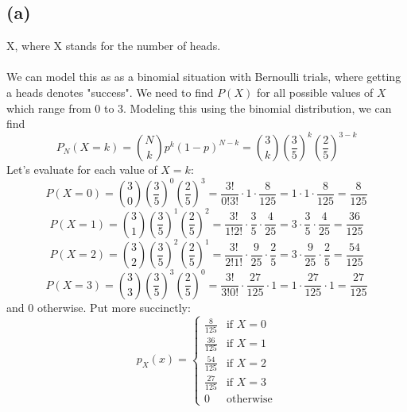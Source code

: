 \documentclass{article}
\begin{document}
{\subsection*{(a)} 
X, where X stands for the number of heads.
\\
\\
We can model this as as a binomial situation with Bernoulli trials, where getting a heads denotes "success". We need to find \(P(X)\) for all possible values of \(X\) which range from 0 to 3. Modeling this using the binomial distribution, we can find 
\[
P_N(X=k) = \binom{N}{k}p^k{(1-p)}^{N-k} = \binom{3}{k}{(\frac{3}{5})}^k{(\frac{2}{5})}^{3-k} 
\]
Let's evaluate for each value of \(X=k\):
\[
P(X=0) = \binom{3}{0}{(\frac{3}{5})}^0{(\frac{2}{5})}^3 = \frac{3!}{0!3!} \cdot 1 \cdot \frac{8}{125} = 1 \cdot 1 \cdot \frac{8}{125} = \frac{8}{125}
\]
\[
P(X=1) = \binom{3}{1}{(\frac{3}{5})}^1{(\frac{2}{5})}^2 = \frac{3!}{1!2!} \cdot \frac{3}{5} \cdot \frac{4}{25} = 3 \cdot \frac{3}{5} \cdot \frac{4}{25} = \frac{36}{125}
\]
\[
P(X=2) = \binom{3}{2}{(\frac{3}{5})}^2{(\frac{2}{5})}^1 = \frac{3!}{2!1!} \cdot \frac{9}{25} \cdot \frac{2}{5} = 3 \cdot \frac{9}{25} \cdot \frac{2}{5} = \frac{54}{125}
\]
\[
P(X=3) = \binom{3}{3}{(\frac{3}{5})}^3{(\frac{2}{5})}^0 = \frac{3!}{3!0!} \cdot \frac{27}{125} \cdot 1 = 1 \cdot \frac{27}{125} \cdot 1 = \frac{27}{125}
\]
and 0 otherwise. Put more succinctly:
\[
p_{X}(x) = \begin{cases}
\frac{8}{125} & \text{if } X = 0 \\
\frac{36}{125} & \text{if } X = 1 \\
\frac{54}{125} & \text{if } X = 2 \\
\frac{27}{125} & \text{if } X = 3 \\
0 & \text{otherwise}
\end{cases}
\]

}
\end{document}
